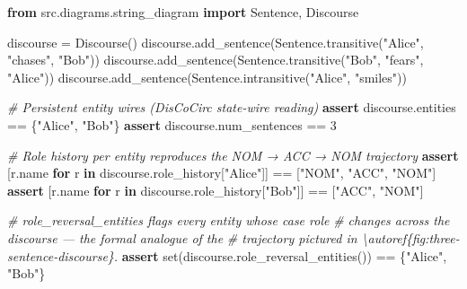 \documentclass[
]{article}
\newenvironment{Shaded}{}{}
\newcommand{\BuiltInTok}[1]{\textcolor[rgb]{0.00,0.50,0.00}{#1}}
\newcommand{\CommentTok}[1]{\textcolor[rgb]{0.38,0.63,0.69}{\textit{#1}}}
\newcommand{\ControlFlowTok}[1]{\textcolor[rgb]{0.00,0.44,0.13}{\textbf{#1}}}
\newcommand{\DecValTok}[1]{\textcolor[rgb]{0.25,0.63,0.44}{#1}}
\newcommand{\ImportTok}[1]{\textcolor[rgb]{0.00,0.50,0.00}{\textbf{#1}}}
\newcommand{\KeywordTok}[1]{\textcolor[rgb]{0.00,0.44,0.13}{\textbf{#1}}}
\newcommand{\NormalTok}[1]{#1}
\newcommand{\OperatorTok}[1]{\textcolor[rgb]{0.40,0.40,0.40}{#1}}
\newcommand{\StringTok}[1]{\textcolor[rgb]{0.25,0.44,0.63}{#1}}
\begin{document}
\begin{Shaded}
\begin{Highlighting}[]
\ImportTok{from}\NormalTok{ src.diagrams.string\_diagram }\ImportTok{import}\NormalTok{ Sentence, Discourse}

\NormalTok{discourse }\OperatorTok{=}\NormalTok{ Discourse()}
\NormalTok{discourse.add\_sentence(Sentence.transitive(}\StringTok{"Alice"}\NormalTok{, }\StringTok{"chases"}\NormalTok{, }\StringTok{"Bob"}\NormalTok{))}
\NormalTok{discourse.add\_sentence(Sentence.transitive(}\StringTok{"Bob"}\NormalTok{, }\StringTok{"fears"}\NormalTok{, }\StringTok{"Alice"}\NormalTok{))}
\NormalTok{discourse.add\_sentence(Sentence.intransitive(}\StringTok{"Alice"}\NormalTok{, }\StringTok{"smiles"}\NormalTok{))}

\CommentTok{\# Persistent entity wires (DisCoCirc state{-}wire reading)}
\ControlFlowTok{assert}\NormalTok{ discourse.entities }\OperatorTok{==}\NormalTok{ \{}\StringTok{"Alice"}\NormalTok{, }\StringTok{"Bob"}\NormalTok{\}}
\ControlFlowTok{assert}\NormalTok{ discourse.num\_sentences }\OperatorTok{==} \DecValTok{3}

\CommentTok{\# Role history per entity reproduces the NOM → ACC → NOM trajectory}
\ControlFlowTok{assert}\NormalTok{ [r.name }\ControlFlowTok{for}\NormalTok{ r }\KeywordTok{in}\NormalTok{ discourse.role\_history[}\StringTok{"Alice"}\NormalTok{]] }\OperatorTok{==}\NormalTok{ [}\StringTok{"NOM"}\NormalTok{, }\StringTok{"ACC"}\NormalTok{, }\StringTok{"NOM"}\NormalTok{]}
\ControlFlowTok{assert}\NormalTok{ [r.name }\ControlFlowTok{for}\NormalTok{ r }\KeywordTok{in}\NormalTok{ discourse.role\_history[}\StringTok{"Bob"}\NormalTok{]]   }\OperatorTok{==}\NormalTok{ [}\StringTok{"ACC"}\NormalTok{, }\StringTok{"NOM"}\NormalTok{]}

\CommentTok{\# \textasciigrave{}role\_reversal\_entities\textasciigrave{} flags every entity whose case role}
\CommentTok{\# changes across the discourse — the formal analogue of the}
\CommentTok{\# trajectory pictured in \textbackslash{}autoref\{fig:three{-}sentence{-}discourse\}.}
\ControlFlowTok{assert} \BuiltInTok{set}\NormalTok{(discourse.role\_reversal\_entities()) }\OperatorTok{==}\NormalTok{ \{}\StringTok{"Alice"}\NormalTok{, }\StringTok{"Bob"}\NormalTok{\}}
\end{Highlighting}
\end{Shaded}
\end{document}
